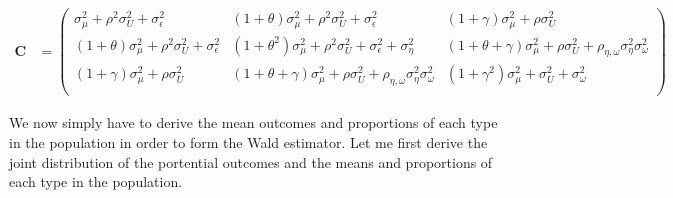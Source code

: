 \documentclass[
]{book}
\theoremstyle{definition}
\theoremstyle{definition}
\theoremstyle{definition}
\theoremstyle{definition}
\theoremstyle{remark}
\begin{document}
\begin{align*}
  \mathbf{C} &=                    \left(\begin{array}{ccc}
                                              \sigma^2_{\mu}+\rho^2\sigma^2_{U} +\sigma^2_{\epsilon} &
                                              (1+\theta)\sigma^2_{\mu}+\rho^2\sigma^2_U + \sigma^2_{\epsilon} &
                                              (1+\gamma)\sigma^2_{\mu}+\rho\sigma^2_U \\
                                              (1+\theta)\sigma^2_{\mu}+\rho^2\sigma^2_U + \sigma^2_{\epsilon} &
                                              (1+\theta^2)\sigma^2_{\mu}+\rho^2\sigma^2_{U} +\sigma^2_{\epsilon} + \sigma^2_{\eta} &
                                              (1+\theta+\gamma)\sigma^2_{\mu}+\rho\sigma^2_U+\rho_{\eta,\omega}\sigma^2_{\eta}\sigma^2_{\omega} \\
                                              (1+\gamma)\sigma^2_{\mu}+\rho\sigma^2_U &
                                              (1+\theta+\gamma)\sigma^2_{\mu}+\rho\sigma^2_U+\rho_{\eta,\omega}\sigma^2_{\eta}\sigma^2_{\omega} &
                                              (1+\gamma^2)\sigma^2_{\mu}+\sigma^2_U+\sigma^2_{\omega} \\
                                              \end{array}
                                        \right)
\end{align*}

We now simply have to derive the mean outcomes and proportions of each type in the population in order to form the Wald estimator.
Let me first derive the joint distribution of the portential outcomes and the means and proportions of each type in the population.
\end{document}
